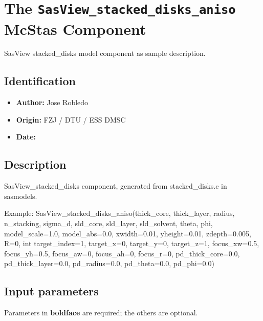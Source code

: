 \section{The \texttt{SasView\_stacked\_disks\_aniso} McStas Component}
SasView stacked\_disks model component as sample description.

\subsection*{Identification}
\begin{itemize}
  \item \textbf{Author:} Jose Robledo
  \item \textbf{Origin:} FZJ / DTU / ESS DMSC
  \item \textbf{Date:} 
\end{itemize}

\subsection*{Description}
SasView\_stacked\_disks component, generated from stacked\_disks.c in sasmodels.

Example: SasView\_stacked\_disks\_aniso(thick\_core, thick\_layer, radius, n\_stacking, sigma\_d, sld\_core, sld\_layer, sld\_solvent, theta, phi, model\_scale=1.0, model\_abs=0.0, xwidth=0.01, yheight=0.01, zdepth=0.005, R=0, int target\_index=1, target\_x=0, target\_y=0, target\_z=1, focus\_xw=0.5, focus\_yh=0.5, focus\_aw=0, focus\_ah=0, focus\_r=0, pd\_thick\_core=0.0, pd\_thick\_layer=0.0, pd\_radius=0.0, pd\_theta=0.0, pd\_phi=0.0)

\subsection*{Input parameters}
Parameters in \textbf{boldface} are required; the others are optional.

